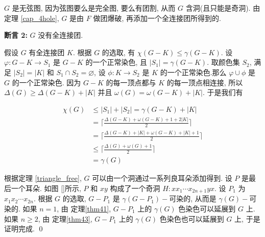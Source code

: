 \documentclass[12pt,a4paper]{article}%
\begin{document}
\begin{pf}
\begin{pf}
    $G$ 是无弦图, 因为弦图要么是完全图, 要么有团割, 从而 $G$ 含洞(且只能是奇洞). 由定理 \ref{cap_4hole}, $G$ 是由 $F$ 做团爆破, 再添加一个全连接团所得到的.

    \textbf{断言 2:} \quad $G$ 没有全连接团.

    假设 $G$ 有全连接团 $K$. 根据 $G$ 的选取, 有 $\chi(G-K) \leq \gamma(G-K)$. 设 $\varphi : G-K \rightarrow S_1$ 是 $G-K$ 的一个正常染色, 且 $|S_1| = \gamma(G-K)$. 取颜色集 $S_2$, 满足 $|S_2| = |K|$ 和 $S_1 \cap S_2 = \varnothing$, 设 $\phi : K \rightarrow S_2$ 是 $K$ 的一个正常染色.那么 $\varphi \cup \phi$ 是 $G$ 的一个正常染色. 因为 $G-K$ 的每一顶点都与 $K$ 的每一顶点相连接, 所以 $\Delta(G) \geq \Delta(G-K) + |K|$ 并且 $\omega(G) = \omega(G-K) + |K|$. 于是我们有

    \begin{align*}
        \chi(G) &\leq |S_1|+|S_2|=\gamma(G-K)+|K|\\
                &= \lceil\frac{\Delta(G-K)+\omega(G-K)+1+2|K|}{2}\rceil\\
                &= \lceil\frac{\Delta(G-K)+|K|+\omega(G-K)+|K|+1}{2}\rceil\\
                &\leq \lceil\frac{\Delta(G)+\omega(G)+1}{2}\rceil\\
                &= \gamma(G)
    \end{align*}

    根据定理 \ref{triangle_free}, $G$ 可以由一个洞通过一系列良耳朵添加得到. 设 $P$ 是最后一个耳朵. 如图 \ref{}所示, $P$ 和 $xy$ 构成了一个奇洞 $H:xx_1\cdots x_{2n+1}yx$. 设 $P_1$ 为 $x_1x_2\cdots x_{2n}$. 根据 $G$ 的选取, $G-P_1$ 是 $\gamma(G-P_1)-$可染的, 从而是 $\gamma(G)-$可染的. 如果 $n=1$, 由 定理\ref{thm41}, $G-P_1$ 上的 $\gamma(G)$ 色染色可以延展到 $G$ 上. 如果 $n \geq 2$, 由 定理\ref{thm43}, $G-P_1$ 上的 $\gamma(G)$ 色染色也可以延展到 $G$ 上, 于是证明完成. \qed
\end{pf}


\end{pf}

\newpage
\printbibliography[title={参考文献}]
\end{document}
